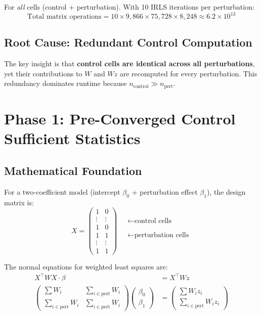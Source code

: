 \documentclass{article}
\begin{document}
For \emph{all} cells (control + perturbation). With 10 IRLS iterations per perturbation:
\[
\text{Total matrix operations} = 10 \times 9{,}866 \times 75{,}728 \times 8{,}248 \approx 6.2 \times 10^{13}
\]

\subsection{Root Cause: Redundant Control Computation}

The key insight is that \textbf{control cells are identical across all perturbations}, yet their contributions to $W$ and $Wz$ are recomputed for every perturbation. This redundancy dominates runtime because $n_{\text{control}} \gg n_{\text{pert}}$.

\section{Phase 1: Pre-Converged Control Sufficient Statistics}

\subsection{Mathematical Foundation}

For a two-coefficient model (intercept $\beta_0$ + perturbation effect $\beta_1$), the design matrix is:
\[
X = \begin{pmatrix}
1 & 0 \\
\vdots & \vdots \\
1 & 0 \\
1 & 1 \\
\vdots & \vdots \\
1 & 1
\end{pmatrix}
\quad
\begin{matrix}
\leftarrow \text{control cells} \\
\\
\\
\leftarrow \text{perturbation cells}\\
\\
\end{matrix}
\]

The normal equations for weighted least squares are:
\begin{align}
    X^\top W X \cdot \beta &= X^\top W z \\
    \begin{pmatrix}
        \sum W_i & \sum_{i \in \text{pert}} W_i \\
        \sum_{i \in \text{pert}} W_i & \sum_{i \in \text{pert}} W_i
    \end{pmatrix}
    \begin{pmatrix}
        \beta_0 \\ \beta_1
    \end{pmatrix}
    &=
    \begin{pmatrix}
        \sum W_i z_i \\
        \sum_{i \in \text{pert}} W_i z_i
    \end{pmatrix}
\end{align}
\end{document}
